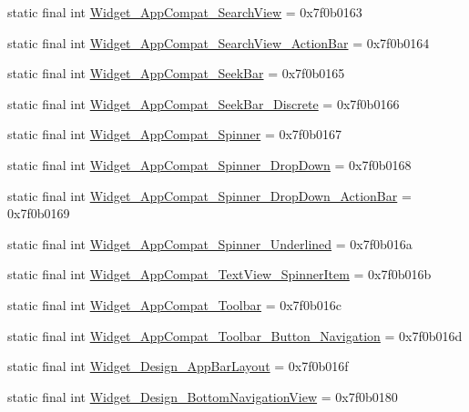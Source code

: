 \begin{CompactItemize}
static final int \hyperlink{classcom_1_1companyname_1_1x__2doo_1_1_r_1_1style_1731851c0512aa1ed27c57cdff4dbfcd}{Widget\_\-AppCompat\_\-SearchView} = 0x7f0b0163
\item 
static final int \hyperlink{classcom_1_1companyname_1_1x__2doo_1_1_r_1_1style_ba60c056b94572cf9ccaebbe57e6eea2}{Widget\_\-AppCompat\_\-SearchView\_\-ActionBar} = 0x7f0b0164
\item 
static final int \hyperlink{classcom_1_1companyname_1_1x__2doo_1_1_r_1_1style_3d37163f548ed2b3b45b0a2a7bf82541}{Widget\_\-AppCompat\_\-SeekBar} = 0x7f0b0165
\item 
static final int \hyperlink{classcom_1_1companyname_1_1x__2doo_1_1_r_1_1style_a65fb71d982effd02e69de051c2fa744}{Widget\_\-AppCompat\_\-SeekBar\_\-Discrete} = 0x7f0b0166
\item 
static final int \hyperlink{classcom_1_1companyname_1_1x__2doo_1_1_r_1_1style_159a114e0f3e2a8c0c63851104a9f330}{Widget\_\-AppCompat\_\-Spinner} = 0x7f0b0167
\item 
static final int \hyperlink{classcom_1_1companyname_1_1x__2doo_1_1_r_1_1style_ae08094833ab07d1f322d19923744248}{Widget\_\-AppCompat\_\-Spinner\_\-DropDown} = 0x7f0b0168
\item 
static final int \hyperlink{classcom_1_1companyname_1_1x__2doo_1_1_r_1_1style_9bcefc224c1beeceb37b6477f8b01c49}{Widget\_\-AppCompat\_\-Spinner\_\-DropDown\_\-ActionBar} = 0x7f0b0169
\item 
static final int \hyperlink{classcom_1_1companyname_1_1x__2doo_1_1_r_1_1style_159f257d99b665e19481b9d2a22f49cd}{Widget\_\-AppCompat\_\-Spinner\_\-Underlined} = 0x7f0b016a
\item 
static final int \hyperlink{classcom_1_1companyname_1_1x__2doo_1_1_r_1_1style_a8e6be7d2695ca5e9fb8fc8cb50d2721}{Widget\_\-AppCompat\_\-TextView\_\-SpinnerItem} = 0x7f0b016b
\item 
static final int \hyperlink{classcom_1_1companyname_1_1x__2doo_1_1_r_1_1style_e8ad53d5bef155f2f1d602317f837964}{Widget\_\-AppCompat\_\-Toolbar} = 0x7f0b016c
\item 
static final int \hyperlink{classcom_1_1companyname_1_1x__2doo_1_1_r_1_1style_667a18939aa828ecc43bfe10e7d1a292}{Widget\_\-AppCompat\_\-Toolbar\_\-Button\_\-Navigation} = 0x7f0b016d
\item 
static final int \hyperlink{classcom_1_1companyname_1_1x__2doo_1_1_r_1_1style_8a6c60175a99303db1c27e9b37f30c3a}{Widget\_\-Design\_\-AppBarLayout} = 0x7f0b016f
\item 
static final int \hyperlink{classcom_1_1companyname_1_1x__2doo_1_1_r_1_1style_7d18110e26128d3da3e5565d3e721a12}{Widget\_\-Design\_\-BottomNavigationView} = 0x7f0b0180

\end{CompactItemize}
